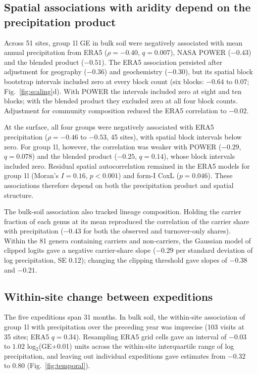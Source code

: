 \documentclass[11pt]{article}
\begin{document}
\subsection*{Spatial associations with aridity depend on the precipitation product}
Across 51 sites, group 1l GE in bulk soil were negatively associated with mean annual precipitation from
ERA5 ($\rho=-0.40$, $q=0.007$), NASA POWER ($-0.43$) and the blended product ($-0.51$).
The ERA5 association persisted after adjustment for geography ($-0.36$) and geochemistry ($-0.30$),
but its spatial block bootstrap intervals included zero at every block count (six blocks: $-0.64$ to
$0.07$; Fig.~\ref{fig:scaling}d). With POWER the intervals included zero at eight and ten blocks;
with the blended product they excluded zero at all four block counts. Adjustment for community composition
reduced the ERA5 correlation to $-0.02$.

At the surface, all four groups were negatively associated with ERA5 precipitation ($\rho=-0.46$ to
$-0.53$, 45 sites), with spatial block intervals below zero. For group 1l, however, the correlation
was weaker with POWER ($-0.29$, $q=0.078$) and the blended product ($-0.25$, $q=0.14$), whose block
intervals included zero. Residual spatial autocorrelation remained in the ERA5 models for group 1l
(Moran's $I=0.16$, $p<0.001$) and form-I CoxL ($p=0.046$). These associations therefore depend on
both the precipitation product and spatial structure.

The bulk-soil association also tracked lineage composition. Holding the carrier fraction of each genus
at its mean reproduced the correlation of the carrier share with precipitation ($-0.43$ for both the
observed and turnover-only shares). Within the 81 genera containing carriers and non-carriers, the
Gaussian model of clipped logits gave a negative carrier-share slope ($-0.29$ per standard deviation of
log precipitation, SE 0.12); changing the clipping threshold gave slopes of $-0.38$ and $-0.21$.

\subsection*{Within-site change between expeditions}
The five expeditions span 31 months. In bulk soil, the within-site association of group 1l with
precipitation over the preceding year was imprecise (103 visits at 35 sites; ERA5 $q=0.34$).
Resampling ERA5 grid cells gave an interval of $-0.03$ to $1.02$ log$_2$(GE+0.01) units across the
within-site interquartile range of log precipitation, and leaving out individual expeditions gave
estimates from $-0.32$ to $0.80$ (Fig.~\ref{fig:temporal}).
\end{document}
